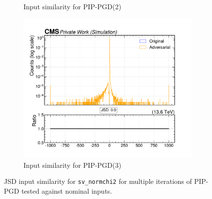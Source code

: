 \begin{figure}[htbp]
\begin{subfigure}[t]{0.32\textwidth}
    \caption*{Input similarity for PIP-PGD(2)}
  \end{subfigure}\hfill
  \begin{subfigure}[t]{0.32\textwidth}
    \includegraphics[width=\linewidth]{media/output/features/compare/combined_it_3/cmp_vtx_arr_sv_normchi2.pdf}
    \caption*{Input similarity for PIP-PGD(3)}
  \end{subfigure}

  \caption*{JSD input similarity for \texttt{sv\_normchi2} for multiple iterations of PIP-PGD tested against nominal inputs.}
  \label{fig:combined_input_sv_normchi2}
\end{figure}


